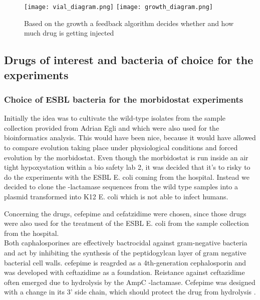 \begin{figure}
	\texttt{[image: vial\_diagram.png]}
	\texttt{[image: growth\_diagram.png]}
	\caption{Based on the growth a feedback algorithm decides whether and how much drug is getting injected}
	\label{figure:vial_setup}
\end{figure}

\subsection{Drugs of interest and bacteria of choice for the experiments}
\subsubsection{Choice of ESBL bacteria for the morbidostat experiments}
Initially the idea was to cultivate the wild-type isolates from the sample collection provided from Adrian Egli and which were also used for the bioinformatics analysis. This would have been nice, because it would have allowed to compare evolution taking place under physiological conditions and forced evolution by the morbidostat. 
Even though the morbidostat is run inside an air tight hypoxystation within a bio safety lab 2, it was decided that it's to risky to do the experiments with the ESBL E. coli coming from the hospital. Instead we decided to clone the \textbeta-lactamase sequences from the wild type samples into a plasmid transformed into K12 E. coli which is not able to infect humans.

Concerning the drugs, cefepime and cefatzidime were chosen, since those drugs were also used for the treatment of the ESBL E. coli from the sample collection from the hospital.\\
Both caphalosporines are effectively bactrocidal against gram-negative bacteria and act by inhibiting the synthesis of the peptidogylcan layer of gram negative bacterial cell walls. cefepime is reagrded as a 4th-generation cephalosporin and was developed with ceftazidime as a foundation. Reistance against ceftazidime often emerged due to hydrolysis by the AmpC \textbeta-lactamase. Cefepime was designed with a change in its 3' side chain, which should protect the drug from hydrolysis \cite{cefepime}.  








 






